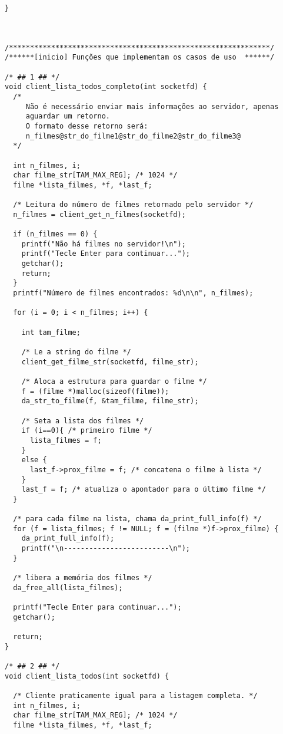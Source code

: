 \documentclass[11pt,twoside]{article}
\begin{document}
\begin{verbatim}
}



/**************************************************************/
/******[inicio] Funções que implementam os casos de uso  ******/

/* ## 1 ## */
void client_lista_todos_completo(int socketfd) {
  /* 
     Não é necessário enviar mais informações ao servidor, apenas
     aguardar um retorno.
     O formato desse retorno será:
     n_filmes@str_do_filme1@str_do_filme2@str_do_filme3@
  */

  int n_filmes, i;
  char filme_str[TAM_MAX_REG]; /* 1024 */
  filme *lista_filmes, *f, *last_f;
	
  /* Leitura do número de filmes retornado pelo servidor */
  n_filmes = client_get_n_filmes(socketfd);

  if (n_filmes == 0) {
    printf("Não há filmes no servidor!\n");
    printf("Tecle Enter para continuar...");
    getchar();
    return;
  }
  printf("Número de filmes encontrados: %d\n\n", n_filmes);

  for (i = 0; i < n_filmes; i++) {

    int tam_filme;
		
    /* Le a string do filme */
    client_get_filme_str(socketfd, filme_str);

    /* Aloca a estrutura para guardar o filme */
    f = (filme *)malloc(sizeof(filme));
    da_str_to_filme(f, &tam_filme, filme_str);

    /* Seta a lista dos filmes */
    if (i==0){ /* primeiro filme */
      lista_filmes = f;
    }
    else {
      last_f->prox_filme = f; /* concatena o filme à lista */
    }
    last_f = f; /* atualiza o apontador para o último filme */
  }
	
  /* para cada filme na lista, chama da_print_full_info(f) */
  for (f = lista_filmes; f != NULL; f = (filme *)f->prox_filme) {
    da_print_full_info(f);
    printf("\n-------------------------\n");
  }
	
  /* libera a memória dos filmes */
  da_free_all(lista_filmes);

  printf("Tecle Enter para continuar...");
  getchar();

  return;
}

/* ## 2 ## */
void client_lista_todos(int socketfd) {

  /* Cliente praticamente igual para a listagem completa. */
  int n_filmes, i;
  char filme_str[TAM_MAX_REG]; /* 1024 */
  filme *lista_filmes, *f, *last_f;
	

\end{verbatim}
\end{document}

